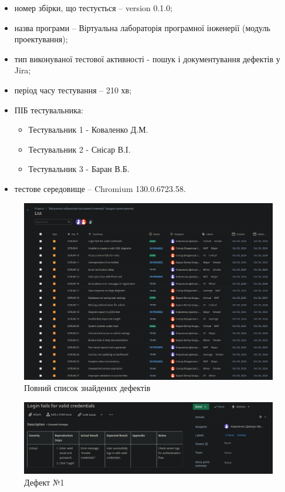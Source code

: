 \documentclass[oneside,14pt]{extarticle}
\begin{document}
\begin{normalsize}
	\begin{itemize}
		\item номер збірки, що тестується – version 0.1.0;
		\item назва програми – Віртуальна лабораторія програмної інженерії (модуль проектування);
		\item тип виконуваної тестової активності - пошук і документування дефектів у Jira;
		\item період часу тестування – 210 хв;
		\item ПІБ тестувальника:
		\begin{itemize}
			\item Тестувальник 1 - Коваленко Д.М.
			\item Тестувальник 2 - Снісар В.І.
			\item Тестувальник 3 - Баран В.Б.
		\end{itemize}
		\item тестове середовище – Chromium 130.0.6723.58.
	\end{itemize}
	
	\begin{figure}[H]
		\centering
		\includegraphics[width=\columnwidth]{1}
		\caption{Повний список знайдених дефектів}
	\end{figure}
	
	\begin{figure}[H]
		\centering
		\includegraphics[width=\columnwidth]{2}
		\caption{Дефект №1}
	\end{figure}
	

\end{normalsize}
\end{document}
